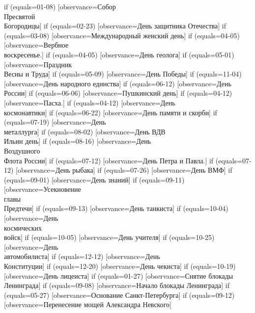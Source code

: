 {  if (equals=01-08) [observance=Собор\\ Пресвятой\\ Богородицы]
  if (equals=02-23) [observance=День защитника Отечества]
  if (equals=03-08) [observance=Международный женский день]
  if (equals=04-05) [observance=Вербное\\ воскресенье.]
  if (equals=04-05) [observance=День геолога]
  if (equals=05-01) [observance=Праздник\\ Весны и Труда]
  if (equals=05-09) [observance=День Победы]
  if (equals=11-04) [observance=День народного единства]
  if (equals=06-12) [observance=День России]
  if (equals=06-06) [observance=Пушкинский день]
  if (equals=04-12) [observance=Пасха.]
  if (equals=04-12) [observance=День\\ космонавтики]
  if (equals=06-22) [observance=День памяти и скорби]
  if (equals=07-19) [observance=День\\ металлурга]
  if (equals=08-02) [observance=День ВДВ\\ Ильин день]
  if (equals=08-16) [observance=День\\ Воздушного\\ Флота России]
  if (equals=07-12) [observance=День Петра и Павла.]
  if (equals=07-12) [observance=День рыбака]
  if (equals=07-26) [observance=День ВМФ]
  if (equals=09-01) [observance=День знаний]
  if (equals=09-11) [observance=Усекновение\\ главы\\ Предтечи]
  if (equals=09-13) [observance=День танкиста]
  if (equals=10-04) [observance=День\\ космических\\ войск]
  if (equals=10-05) [observance=День учителя]
  if (equals=10-25) [observance=День\\ автомобилиста]
  if (equals=12-12) [observance=День\\ Конституции]
  if (equals=12-20) [observance=День чекиста]
  if (equals=10-19) [observance=День лицеиста]
  if (equals=01-27) [observance=Снятие блокады Ленинграда]
  if (equals=09-08) [observance=Начало блокады Ленинграда]
  if (equals=05-27) [observance=Основание Санкт-Петербурга]
  if (equals=09-12) [observance=Перенесение мощей Александра Невского]
}
